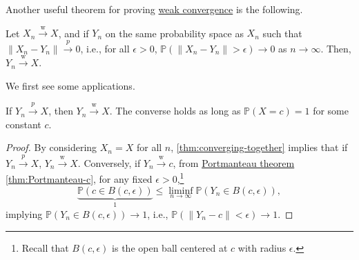 Another useful theorem for proving \hyperref[def:converge-weakly]{weak convergence} is the following.

\begin{theorem}\label{thm:converging-together}
	Let \(X_n \overset{\text{w} }{\to } X\), and if \(Y_n\) on the same probability space as \(X_n\) such that \(\lVert X_n - Y_n \rVert \overset{p}{\to } 0\), i.e., for all \(\epsilon > 0\), \(\mathbb{P} (\lVert X_n - Y_n \rVert > \epsilon ) \to 0\) as \(n \to \infty\). Then, \(Y_n \overset{\text{w} }{\to } X\).
\end{theorem}

We first see some applications.

\begin{corollary}\label{col:weak-probability-constant}
	If \(Y_n \overset{p}{\to } X\), then \(Y_n \overset{\text{w} }{\to } X\). The converse holds as long as \(\mathbb{P} (X = c) = 1\) for some constant \(c\).
\end{corollary}
\begin{proof}
	By considering \(X_n = X\) for all \(n\), \autoref{thm:converging-together} implies that if \(Y_n \overset{p}{\to } X\), \(Y_n \overset{\text{w} }{\to } X\). Conversely, if \(Y_n \overset{\text{w} }{\to } c\), from \hyperref[thm:Portmanteau]{Portmanteau theorem} \autoref{thm:Portmanteau-c}, for any fixed \(\epsilon > 0\),\footnote{Recall that \(B(c, \epsilon )\) is the open ball centered at \(c\) with radius \(\epsilon \).}
	\[
		\underbrace{\mathbb{P} (c \in B(c, \epsilon ))}_{1}
		\leq \liminf_{n \to \infty} \mathbb{P} (Y_n \in B(c, \epsilon )),
	\]
	implying \(\mathbb{P} (Y_n \in B(c, \epsilon )) \to 1\), i.e., \(\mathbb{P} (\lVert Y_n - c \rVert < \epsilon ) \to 1\).
\end{proof}